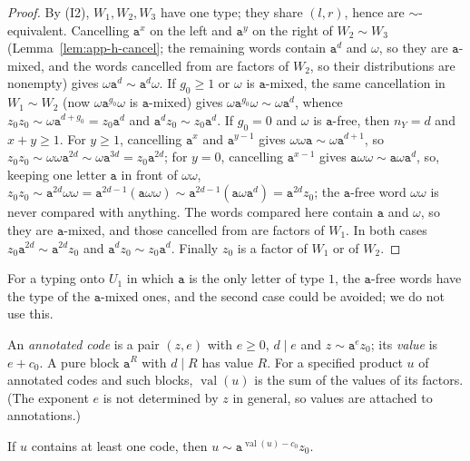 \begin{proof}
By (I2), $W_1,W_2,W_3$ have one type; they share $(l,r)$, hence are
$\sim$-equivalent.  Cancelling $\mathtt a^x$ on the left and $\mathtt a^y$ on the
right of $W_2\sim W_3$ (Lemma~\ref{lem:app-h-cancel}; the remaining words contain
$\mathtt a^d$ and $\omega$, so they are $\mathtt a$-mixed, and the words cancelled
from are factors of $W_2$, so their distributions are nonempty) gives
$\omega\mathtt a^d\sim\mathtt a^d\omega$.  If $g_0\ge1$
or $\omega$ is $\mathtt a$-mixed, the same cancellation in $W_1\sim W_2$ (now
$\omega\mathtt a^{g_0}\omega$ is $\mathtt a$-mixed) gives $\omega\mathtt
a^{g_0}\omega\sim\omega\mathtt a^d$, whence $z_0z_0\sim\omega\mathtt
a^{d+g_0}=z_0\mathtt a^d$ and $\mathtt a^dz_0\sim z_0\mathtt a^d$.  If $g_0=0$ and
$\omega$ is $\mathtt a$-free, then $n_Y=d$ and $x+y\ge1$.  For $y\ge1$,
cancelling $\mathtt a^x$ and $\mathtt a^{y-1}$ gives $\omega\omega\mathtt
a\sim\omega\mathtt a^{d+1}$, so $z_0z_0\sim\omega\omega\mathtt a^{2d}\sim\omega\mathtt
a^{3d}=z_0\mathtt a^{2d}$; for $y=0$, cancelling $\mathtt a^{x-1}$ gives $\mathtt
a\omega\omega\sim\mathtt a\omega\mathtt a^d$, so, keeping one letter $\mathtt a$
in front of $\omega\omega$, $z_0z_0\sim\mathtt a^{2d}\omega\omega=\mathtt
a^{2d-1}(\mathtt a\omega\omega)\sim\mathtt a^{2d-1}(\mathtt a\omega\mathtt
a^d)=\mathtt a^{2d}z_0$; the $\mathtt a$-free word $\omega\omega$ is never compared
with anything.  The words compared here contain
$\mathtt a$ and $\omega$, so they are $\mathtt a$-mixed, and those cancelled from
are factors of $W_1$.  In both cases $z_0\mathtt
a^{2d}\sim\mathtt a^{2d}z_0$ and $\mathtt a^dz_0\sim z_0\mathtt a^d$.  Finally $z_0$
is a factor of $W_1$ or of $W_2$.
\end{proof}

For a typing onto $U_1$ in which $\mathtt a$ is the only letter of type $1$, the
$\mathtt a$-free words have the type of the $\mathtt a$-mixed ones, and the
second case could be avoided; we do not use this.

An \emph{annotated code} is a pair $(z,e)$ with $e\ge0$, $d\mid e$ and $z\sim
\mathtt a^ez_0$; its \emph{value} is $e+c_0$.  A pure block $\mathtt a^R$ with
$d\mid R$ has value $R$.  For a specified product $u$ of annotated codes and
such blocks, $\operatorname{val}(u)$ is the sum of the values of its factors.
(The exponent $e$ is not determined by $z$ in general, so values are attached
to annotations.)

\begin{lemma}
\label{lem:app-h-collapse}
If $u$ contains at least one code, then $u\sim\mathtt
a^{\operatorname{val}(u)-c_0}z_0$.
\end{lemma}

